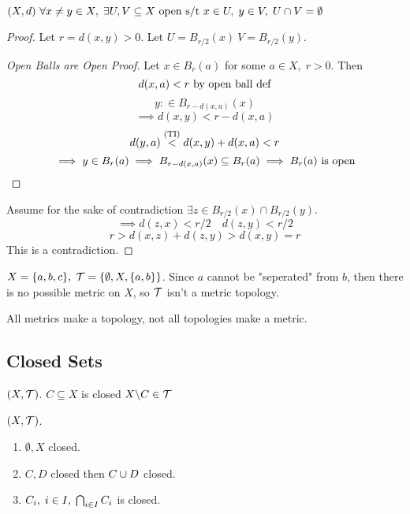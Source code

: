 \documentclass[12pt]{article}
\begin{document}
\bboxprop
\begin{prop}
    \((X,d)\ \forall x\neq y\in X,\;\exists U,V\subseteq X\text{ open}\text{ s/t } x\in U,\;y\in V,\;
    U\cap V=\emptyset\)
\end{prop}
\ebox

\bboxproof
\begin{proof}[Proof]
    Let \(r=d(x,y)>0\). Let \(U=B_{r/2}(x)\ V=B_{r/2}(y)\).
    \bboxproof
    \begin{proof}[Open Balls are Open Proof]
        Let \(x\in B_r(a)\) for some \(a\in X,\;r>0\). Then
        \[
            d(x,a)<r\text{ by open ball def}
        \]
        \[
            y\mathbin{:\in}B_{r-d(x,a)}(x)
        \]
        \[
            \implies d(x,y)<r-d(x,a)
        \]
        \[
            d(y,a)\overset{(\mathrm{TI})}<d(x,y)+d(x,a)<r
        \]
        \[
            \implies y\in B_r(a)\implies B_{r-d(x,a)}(x)\subseteq B_r(a)
            \implies B_r(a)\text{ is open}
        \]
    \end{proof}
    \ebox
    Assume for the sake of contradiction \(\exists z\in B_{r/2}(x)\cap B_{r/2}(y)\).
    \[
        \implies d(z,x)<r/2\quad d(z,y)<r/2
    \]
    \[
        r>d(x,z)+d(z,y)>d(x,y)=r
    \]
    This is a contradiction.
\end{proof}
\ebox

\bboxexam
\begin{exam}
    \(X=\{a,b,c\},\;\mathcal T=\{\emptyset,X,\{a,b\}\}\). Since 
    \(a\) cannot be "seperated" from \(b\), then there is 
    no possible metric on \(X\), so \(\mathcal T\) isn't a metric
    topology.

    All metrics make a topology, not all topologies make a metric.
\end{exam}
\ebox

\subsection{Closed Sets}

\bboxdefn
\begin{defn}
    \((X,\mathcal T)\).
    \(C\subseteq X\) is closed  \(X\backslash C\in\mathcal T\)
\end{defn}
\ebox

\bboxprop
\begin{prop}
    \((X,\mathcal T)\).
    \begin{enumerate}
        \item \(\emptyset,X\) closed.
        \item \(C,D\) closed then \(C\cup D\) closed.
        \item \(C_i,\;i\in I,\;\bigcap_{i\in I}C_i\) is closed.
    \end{enumerate}
\end{prop}
\ebox
\end{document}
